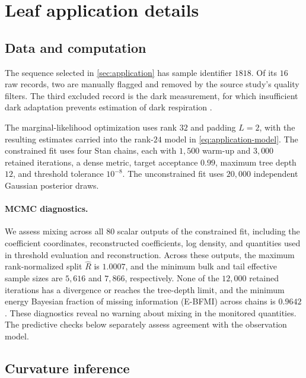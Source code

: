 \section{Leaf application details}\label{sec:application-details}

\subsection{Data and computation}

The sequence selected in \cref{sec:application} has sample identifier
$1818$. Of its $16$ raw records, two are manually flagged and removed
by the source study's quality filters. The third excluded record is
the dark measurement, for which insufficient dark adaptation prevents
estimation of dark respiration \citep{rogers2019arctic}.

The marginal-likelihood optimization uses rank $32$ and padding
$L=2$, with the resulting estimates carried into the rank-$24$
model in \cref{eq:application-model}. The constrained fit uses four Stan chains,
each with $1{,}500$ warm-up and $3{,}000$ retained iterations, a dense
metric, target acceptance $0.99$, maximum tree depth $12$, and threshold
tolerance $10^{-8}$. The unconstrained fit uses $20{,}000$ independent
Gaussian posterior draws.

\paragraph{MCMC diagnostics.}
We assess mixing across all $80$ scalar outputs of the constrained fit,
including the coefficient coordinates, reconstructed coefficients,
log density, and quantities used in threshold evaluation and
reconstruction. Across these outputs, the maximum rank-normalized
split $\widehat R$ is $1.0007$, and the minimum bulk and tail effective
sample sizes are $5{,}616$ and $7{,}866$, respectively. None of the
$12{,}000$ retained iterations has a divergence or reaches the
tree-depth limit, and the minimum energy Bayesian fraction of missing
information (E-BFMI) across chains is $0.9642$. These diagnostics
reveal no warning about mixing in the monitored quantities. The
predictive checks below separately assess agreement with the
observation model.

\subsection{Curvature inference}

